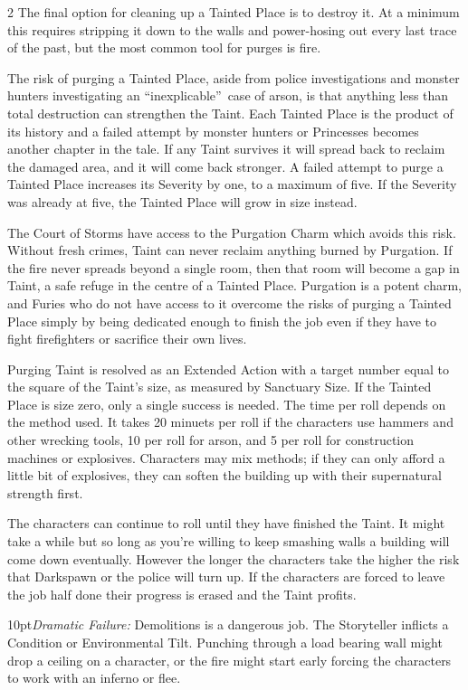 \begin{multicols}{2}
The final option for cleaning up a Tainted Place is to destroy it. At a minimum this requires stripping it down to the walls and power-hosing out every last trace of the past, but the most common tool for purges is fire.

The risk of purging a Tainted Place, aside from police investigations and monster hunters investigating an  \textquotedblleft inexplicable\textquotedblright\, case of arson, is that anything less than total destruction can strengthen the Taint. Each Tainted Place is the product of its history and a failed attempt by monster hunters or Princesses becomes another chapter in the tale. If any Taint survives it will spread back to reclaim the damaged area, and it will come back stronger. A failed attempt to purge a Tainted Place increases its Severity by one, to a maximum of five. If the Severity was already at five, the Tainted Place will grow in size instead.

The Court of Storms have access to the Purgation Charm which avoids this risk. Without fresh crimes, Taint can never reclaim anything burned by Purgation. If the fire never spreads beyond a single room, then that room will become a gap in Taint, a safe refuge in the centre of a Tainted Place. Purgation is a potent charm, and Furies who do not have access to it overcome the risks of purging a Tainted Place simply by being dedicated enough to finish the job even if they have to fight firefighters or sacrifice their own lives.

Purging Taint is resolved as an Extended Action with a target number equal to the square of the Taint’s size, as measured by Sanctuary Size. If the Tainted Place is size zero, only a single success is needed. The time per roll depends on the method used. It takes 20 minuets per roll if the characters use hammers and other wrecking tools, 10 per roll for arson, and 5 per roll for construction machines or explosives. Characters may mix methods; if they can only afford a little bit of explosives, they can soften the building up with their supernatural strength first. 

The characters can continue to roll until they have finished the Taint. It might take a while but so long as you’re willing to keep smashing walls a building will come down eventually. However the longer the characters take the higher the risk that Darkspawn or the police will turn up. If the characters are forced to leave the job half done their progress is erased and the Taint profits. 

 \begin{myindentpar}{10pt}\emph{Dramatic Failure:} Demolitions is a dangerous job. The Storyteller inflicts a Condition or Environmental Tilt. Punching through a load bearing wall might drop a ceiling on a character, or the fire might start early forcing the characters to work with an inferno or flee. 


\end{myindentpar}
\end{multicols}
